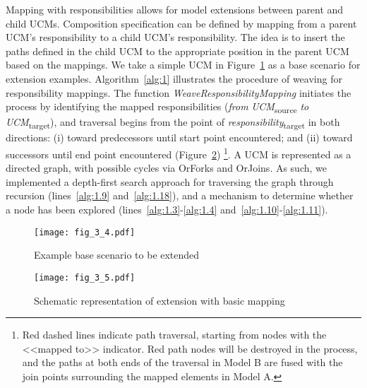 Mapping with responsibilities allows for model extensions between parent and child UCMs. Composition specification can be defined by mapping from a parent UCM's responsibility to a child UCM's responsibility. The idea is to insert the paths defined in the child UCM to the appropriate position in the parent UCM based on the mappings. We take a simple UCM in Figure~\ref{fig:3.4} as a base scenario for extension examples. Algorithm~\ref{alg:1} illustrates the procedure of weaving for responsibility mappings. The function \emph{WeaveResponsibilityMapping} initiates the process by identifying the mapped responsibilities (\emph{from} \emph{UCM}\textsubscript{source} \emph{to} \emph{UCM}\textsubscript{target}), and traversal begins from the point of \emph{responsibility}\textsubscript{target} in both directions: (i) toward predecessors until start point encountered; and (ii) toward successors until end point encountered (Figure~\ref{fig:3.5}) \footnote{Red dashed lines indicate path traversal, starting from nodes with the <<mapped to>> indicator. Red path nodes will be destroyed in the process, and the paths at both ends of the traversal in Model B are fused with the join points surrounding the mapped elements in Model A.}. A UCM is represented as a directed graph, with possible cycles via {\cls OrFork}s and {\cls OrJoin}s. As such, we implemented a depth-first search approach for traversing the graph through recursion (lines~\ref{alg:1.9} and~\ref{alg:1.18}), and a mechanism to determine whether a node has been explored (lines~\ref{alg:1.3}-\ref{alg:1.4} and~\ref{alg:1.10}-\ref{alg:1.11}).

\begin{figure}
	\centering
	\texttt{[image: fig\_3\_4.pdf]}
	\caption{Example base scenario to be extended}
	\label{fig:3.4}
\end{figure}

\begin{figure}[h]
	\centering
	\texttt{[image: fig\_3\_5.pdf]}
	\caption{Schematic representation of extension with basic mapping}
	\label{fig:3.5}
\end{figure}


